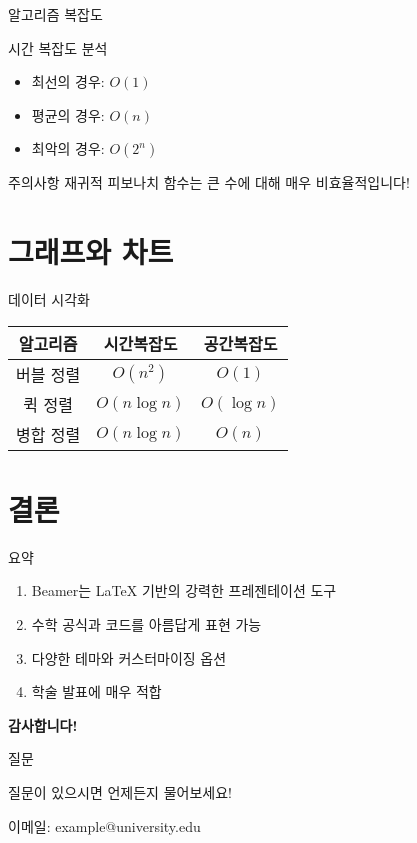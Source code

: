 \documentclass[aspectratio=169]{beamer}
\begin{document}
\begin{frame}[fragile]{알고리즘 복잡도}
    \begin{block}{시간 복잡도 분석}
        \begin{itemize}
            \item 최선의 경우: $O(1)$
            \item 평균의 경우: $O(n)$
            \item 최악의 경우: $O(2^n)$
        \end{itemize}
    \end{block}
    
    \pause
    
    \begin{alertblock}{주의사항}
        재귀적 피보나치 함수는 큰 수에 대해 매우 비효율적입니다!
    \end{alertblock}
\end{frame}

\section{그래프와 차트}

\begin{frame}{데이터 시각화}
    \begin{center}
        \begin{tabular}{|c|c|c|}
            \hline
            \textbf{알고리즘} & \textbf{시간복잡도} & \textbf{공간복잡도} \\
            \hline
            버블 정렬 & $O(n^2)$ & $O(1)$ \\
            퀵 정렬 & $O(n \log n)$ & $O(\log n)$ \\
            병합 정렬 & $O(n \log n)$ & $O(n)$ \\
            \hline
        \end{tabular}
    \end{center}
\end{frame}

\section{결론}

\begin{frame}{요약}
    \begin{enumerate}
        \item<1-> Beamer는 LaTeX 기반의 강력한 프레젠테이션 도구
        \item<2-> 수학 공식과 코드를 아름답게 표현 가능
        \item<3-> 다양한 테마와 커스터마이징 옵션
        \item<4-> 학술 발표에 매우 적합
    \end{enumerate}
    
    \pause
    
    \begin{center}
        \Large \textbf{감사합니다!}
    \end{center}
\end{frame}

\begin{frame}{질문}
    \begin{center}
        \Huge 질문이 있으시면 언제든지 물어보세요!
        
        \vspace{1cm}
        
        \large 이메일: example@university.edu
    \end{center}
\end{frame}
\end{document}
